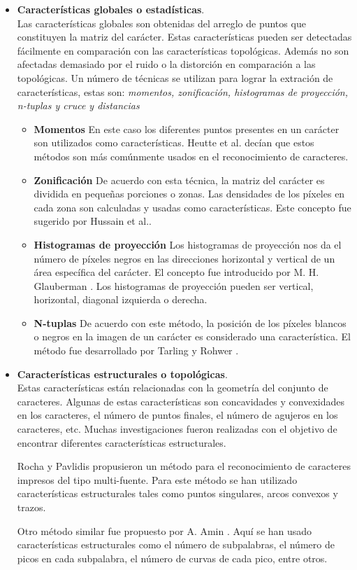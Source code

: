 		\begin{itemize}
			\item \textbf{Características globales o estadísticas}. \\
				Las características globales son obtenidas del arreglo de puntos que constituyen la matriz del carácter. Estas características pueden ser detectadas fácilmente en comparación con las características topológicas. Además no son afectadas demasiado por el ruido o la distorción en comparación a las topológicas. Un número de técnicas se utilizan para lograr la extración de características, estas son: \textit{momentos, zonificación, histogramas de proyección, n-tuplas y cruce y distancias}
				\begin{itemize}
					\item \textbf{Momentos}
					En este caso los diferentes puntos presentes en un carácter son utilizados como características. Heutte et al. \cite{Heutte98} decían que estos métodos son más comúnmente usados en el reconocimiento de caracteres.
					\item \textbf{Zonificación}
					De acuerdo con esta técnica, la matriz del carácter es dividida en pequeñas porciones o zonas. Las densidades de los píxeles en cada zona son calculadas y usadas como características. Este concepto fue sugerido por Hussain et al.\cite{Hussain72}.
					\item \textbf{Histogramas de proyección}
					Los histogramas de proyección nos da el número de píxeles negros en las direcciones horizontal y vertical de un área específica del carácter. El concepto fue introducido por M. H. Glauberman \cite{Glauberman56}. Los histogramas de proyección pueden ser vertical, horizontal, diagonal izquierda o derecha.
					\item \textbf{N-tuplas}
					De acuerdo con este método, la posición de los píxeles blancos o negros en la imagen de un carácter es considerado una característica. El método fue desarrollado por Tarling y Rohwer \cite{TR93}.
				\end{itemize}
			\item \textbf{Características estructurales o topológicas}. \\
				Estas características están relacionadas con la geometría del conjunto de caracteres. Algunas de estas características son concavidades y convexidades en los caracteres, el número de puntos finales, el número de agujeros en los caracteres, etc. Muchas investigaciones fueron realizadas con el objetivo de encontrar diferentes características estructurales.
				
				Rocha y Pavlidis \cite{RP94} propusieron un método para el reconocimiento de caracteres impresos del tipo multi-fuente. Para este método se han utilizado características estructurales tales como puntos singulares, arcos convexos y trazos.
				
				Otro método similar fue propuesto por A. Amin \cite{Amin2000}. Aquí se han usado características estructurales como el número de subpalabras, el número de picos en cada subpalabra, el número de curvas de cada pico, entre otros.
				
		\end{itemize}
		  
